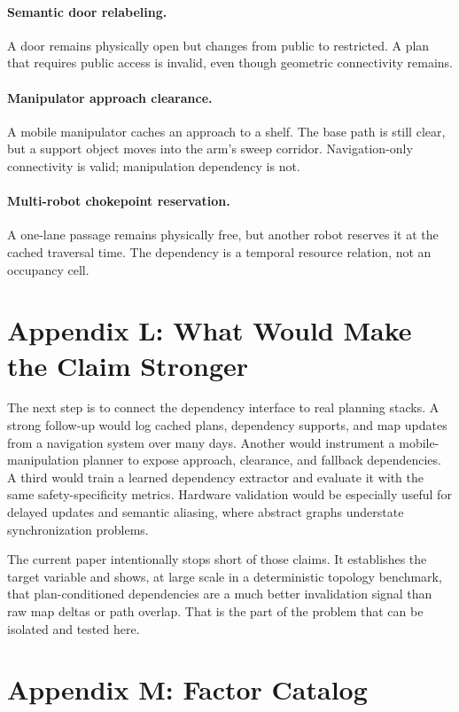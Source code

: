 \documentclass{article}
\begin{document}
\paragraph{Semantic door relabeling.}
A door remains physically open but changes from public to restricted. A plan that requires public access is invalid, even though geometric connectivity remains.

\paragraph{Manipulator approach clearance.}
A mobile manipulator caches an approach to a shelf. The base path is still clear, but a support object moves into the arm's sweep corridor. Navigation-only connectivity is valid; manipulation dependency is not.

\paragraph{Multi-robot chokepoint reservation.}
A one-lane passage remains physically free, but another robot reserves it at the cached traversal time. The dependency is a temporal resource relation, not an occupancy cell.

\section{Appendix L: What Would Make the Claim Stronger}

The next step is to connect the dependency interface to real planning stacks. A strong follow-up would log cached plans, dependency supports, and map updates from a navigation system over many days. Another would instrument a mobile-manipulation planner to expose approach, clearance, and fallback dependencies. A third would train a learned dependency extractor and evaluate it with the same safety-specificity metrics. Hardware validation would be especially useful for delayed updates and semantic aliasing, where abstract graphs understate synchronization problems.

The current paper intentionally stops short of those claims. It establishes the target variable and shows, at large scale in a deterministic topology benchmark, that plan-conditioned dependencies are a much better invalidation signal than raw map deltas or path overlap. That is the part of the problem that can be isolated and tested here.

\section{Appendix M: Factor Catalog}
\end{document}
